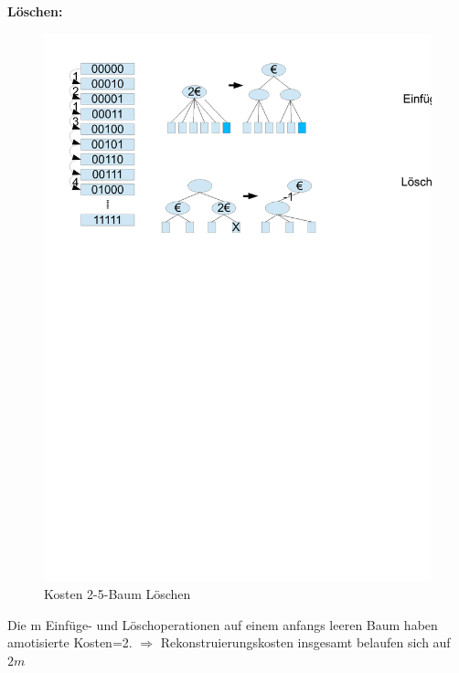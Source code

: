 \documentclass[a4paper,twoside,10pt]{report}
\begin{document}
\textbf{Löschen:}
\begin{figure}[H]\center
\includegraphics[trim=  6cm 18.5cm 6cm 7cm,clip,width=\columnwidth]{figures/zaehler.pdf}
\caption{Kosten 2-5-Baum Löschen}
\end{figure}

Die m Einfüge- und Löschoperationen auf einem anfangs leeren Baum haben amotisierte Kosten=2.
$\Rightarrow$ Rekonstruierungskosten insgesamt belaufen sich auf $2m$
\end{document}
